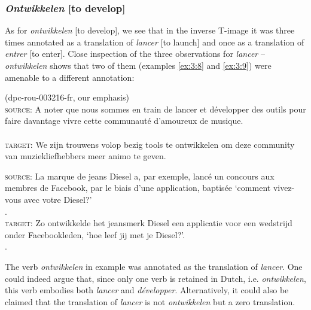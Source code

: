 \subsubsection{\textit{Ontwikkelen} [to develop]}

As for \textit{ontwikkelen} [to develop], we see that in the inverse T-image it was three times annotated as a translation of \textit{lancer} [to launch] and once as a translation of \textit{entrer} [to enter]. Close inspection of the three observations for \textit{lancer} –\textit{ontwikkelen} shows that two of them (examples \ref{ex:3:8} and \ref{ex:3:9}) were amenable to a different annotation:

\ea(dpc-rou-003216-fr, our emphasis)\label{ex:3:8}\\
\textsc{source:} A noter que nous sommes en train de lancer et développer des outils pour faire davantage vivre cette communauté d'amoureux de musique.\\\\
\textsc{target:} We zijn trouwens volop bezig tools te ontwikkelen om deze community van muziekliefhebbers meer animo te geven.\\ 
\z

\ea\label{ex:3:9}
\textsc{source:} La marque de jeans Diesel a, par exemple, lancé un concours aux membres de Facebook, par le biais d'une application, baptisée `comment vivez-vous avec votre Diesel?'\\.\\
\textsc{target:} Zo ontwikkelde het jeansmerk Diesel een applicatie voor een wedstrijd onder Facebookleden, `hoe leef jij met je Diesel?'.\\.
\z

The verb \textit{ontwikkelen} in example  was annotated as the translation of \textit{lancer}. One could indeed argue that, since only one verb is retained in Dutch, i.e. \textit{ontwikkelen}, this verb embodies both \textit{lancer} and \textit{développer}. Alternatively, it could also be claimed that the translation of \textit{lancer} is not \textit{ontwikkelen} but a zero translation.

